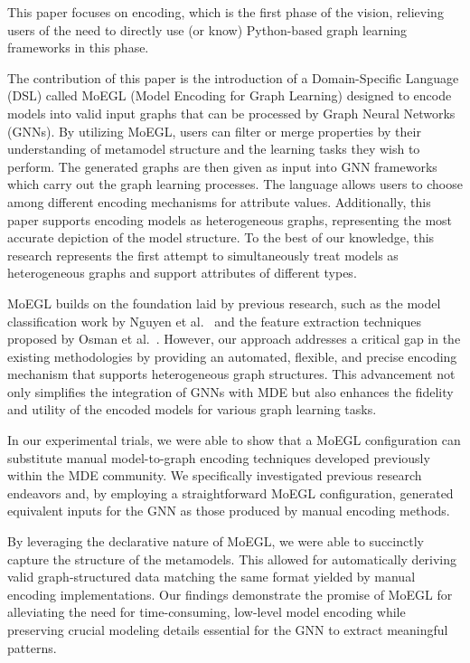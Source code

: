 \documentclass[journal,article,submit,moreauthors,technologies]{Definitions/mdpi}
\begin{document}
This paper focuses on encoding, which is the first phase of the vision, relieving users of the need to directly use (or know) Python-based graph learning frameworks in this phase.

The contribution of this paper is the introduction of a Domain-Specific Language (DSL) called MoEGL (Model Encoding for Graph Learning) designed to encode models into valid input graphs that can be processed by Graph Neural Networks (GNNs). By utilizing MoEGL, users can filter or merge properties by their understanding of metamodel structure and the learning tasks they wish to perform. The generated graphs are then given as input into GNN frameworks which carry out the graph learning processes. The language allows users to choose among different encoding mechanisms for attribute values. Additionally, this paper supports encoding models as heterogeneous graphs, representing the most accurate depiction of the model structure. To the best of our knowledge, this research represents the first attempt to simultaneously treat models as heterogeneous graphs and support attributes of different types.

MoEGL builds on the foundation laid by previous research, such as the model classification work by Nguyen et al.~\cite{nguyen2019automated} and the feature extraction techniques proposed by Osman et al.~\cite{osman2018automated}. However, our approach addresses a critical gap in the existing methodologies by providing an automated, flexible, and precise encoding mechanism that supports heterogeneous graph structures. This advancement not only simplifies the integration of GNNs with MDE but also enhances the fidelity and utility of the encoded models for various graph learning tasks.

In our experimental trials, we were able to show that a MoEGL configuration can substitute manual model-to-graph encoding techniques developed previously within the MDE community.
We specifically investigated previous research endeavors and, by employing a straightforward MoEGL configuration, generated equivalent inputs for the GNN as those produced by manual encoding methods.

By leveraging the declarative nature of MoEGL, we were able to succinctly capture the structure of the metamodels. This allowed for automatically deriving valid graph-structured data matching the same format yielded by manual encoding implementations. Our findings demonstrate the promise of MoEGL for alleviating the need for time-consuming, low-level model encoding while preserving crucial modeling details essential for the GNN to extract meaningful patterns.
\end{document}

